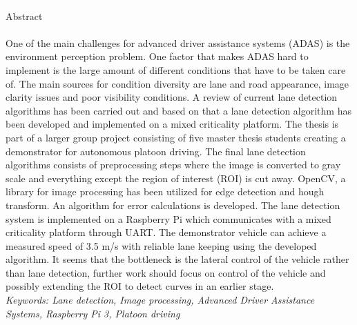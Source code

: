 \textcolor{white}{.}\\[0.5cm]
{\Large Abstract}\\
\textcolor{white}{.}\\
\label{sec:abstract}
\noindent One of the main challenges for advanced driver assistance systems (ADAS) is the environment perception problem. One factor that makes ADAS hard to implement is the large amount of different conditions that have to be taken care of. The main sources for condition diversity are lane and road appearance, image clarity issues and poor visibility conditions. A review of current lane detection algorithms has been carried out and based on that a lane detection algorithm has been developed and implemented on a mixed criticality platform. The thesis is part of a larger group project consisting of five master thesis students creating a demonstrator for autonomous platoon driving. The final lane detection algorithms consists of preprocessing steps where the image is converted to gray scale and everything except the region of interest (ROI) is cut away. OpenCV, a library for image processing has been utilized for edge detection and hough transform. An algorithm for error calculations is developed. The lane detection system is implemented on a Raspberry Pi which communicates with a mixed criticality platform through UART. The demonstrator vehicle can achieve a measured speed of 3.5 m/s with reliable lane keeping using the developed algorithm. It seems that the bottleneck is the lateral control of the vehicle rather than lane detection, further work should focus on control of the vehicle and possibly extending the ROI to detect curves in an earlier stage.\\



\noindent
\textit{Keywords: Lane detection, Image processing, Advanced Driver Assistance Systems, Raspberry Pi 3, Platoon driving}

\setcounter{page}{1}
\vspace{0.25cm}
